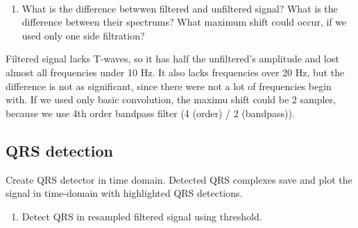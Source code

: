 \documentclass[11pt]{article}
\providecommand{\tightlist}{%
      \setlength{\itemsep}{0pt}\setlength{\parskip}{0pt}}
\begin{document}
    \begin{center}
    \end{center}
    { \hspace*{\fill} \\}
    
    \begin{enumerate}
\def\labelenumi{\alph{enumi})}
\setcounter{enumi}{2}
\tightlist
\item
  What is the difference betwwen filtered and unfiltered signal? What is
  the difference between their spectrums? What maximum shift could
  occur, if we used only one side filtration?
\end{enumerate}

    Filtered signal lacks T-waves, so it has half the unfiltered's amplitude
and lost almost all frequencies under 10 Hz. It also lacks frequencies
over 20 Hz, but the difference is not as significant, since there were
not a lot of frequencies begin with. If we used only basic convolution,
the maximu shift could be 2 samples, because we use 4th order bandpass
filter (4 (order) / 2 (bandpass)).

    \hypertarget{qrs-detection}{%
\subsection{QRS detection}\label{qrs-detection}}

    Create QRS detector in time domain. Detected QRS complexes save and plot
the signal in time-domain with highlighted QRS detections.

    \begin{enumerate}
\def\labelenumi{\alph{enumi})}
\tightlist
\item
  Detect QRS in resampled filtered signal using threshold.
\end{enumerate}
\end{document}
